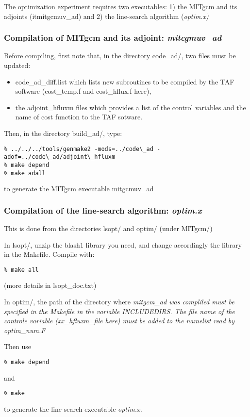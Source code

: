The optimization experiment requires two executables: 1) the 
MITgcm and its adjoints (it{mitgcmuv\_ad}) and 2) the line-search
algorithm (\it{optim.x}) 

\subsubsection{Compilation of MITgcm and its adjoint: \it{mitcgmuv\_ad}}

Before compiling, first note that, in the directory code\_ad/, two files
must be updated:
\begin{itemize}
\item code\_ad\_diff.list which lists new subroutines to be compiled
by the TAF software (cost\_temp.f and cost\_hflux.f here),

\item  the adjoint\_hfluxm files which provides a list of the control variables
and the name of cost function to the TAF sotware.

\end{itemize}

Then, in the directory build\_ad/, type:
\begin{verbatim}
% ../../../tools/genmake2 -mods=../code\_ad -adof=../code\_ad/adjoint\_hfluxm
% make depend
% make adall
\end{verbatim}
to generate the MITgcm executable mitgcmuv\_ad

\subsubsection{Compilation of the line-search algorithm: \it{optim.x}}

This is done from the directories lsopt/ and optim/ (under MITgcm/)

In lsopt/, unzip the blash1 library you need, and change accordingly the
library in the Makefile. Compile with:
\begin{verbatim}
% make all
\end{verbatim}
(more details in lsopt\_doc.txt)

In optim/,  the path of the directory where \it{mitgcm\_ad} was compliled must be specified
in the Makefile in the variable INCLUDEDIRS. The file name of the controle variable
(xx\_hfluxm\_file here) must be added to the namelist read by optim\_num.F

Then use
\begin{verbatim}
% make depend
\end{verbatim} 
and
\begin{verbatim}
% make
\end{verbatim}
to generate the line-search executable \it{optim.x}.

